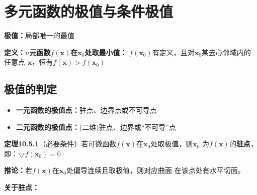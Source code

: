 \section{多元函数的极值与条件极值}

{\bf 极值：}局部唯一的最值

{\bf 定义：}{\bf $n$元函数$f(\bm{x})$在$\bm{x}_0$处取最小值：}
$f(\bm{x}_0)$有定义，且对$\bm{x}_0$某去心邻域内的任意点
$\bm{x}$，恒有$f(\bm{x})>f(\bm{x}_0)$

% 	

\subsection{极值的判定}

\begin{itemize}
  \item {\bf 一元函数的极值点：}驻点、边界点或不可导点 
  \item {\bf 二元函数的极值点：}(二维)驻点、边界或“不可导”点 
\end{itemize}


{\bf 定理10.5.1}（必要条件）若可微函数$f(\bm{x})$在$\bm{x}_0$处取极值，则$\bm{x}_0$
为$f(\bm{x})$的{\bf 驻点}，即：$\bigtriangledown f(\bm{x}_0)=0$

{\bf 推论：}若$f(\bm{x})$在$\bm{x}_0$处偏导连续且取极值，则对应曲面
在该点处有水平切面。

{\bf 关于驻点：}

